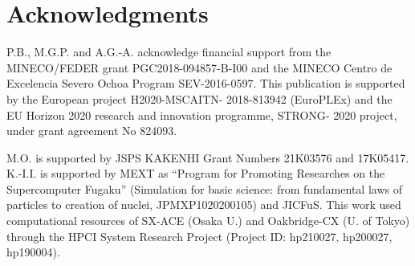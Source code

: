 \documentclass[a4paper,11pt]{article}
\begin{document}
\section*{Acknowledgments}
P.B., M.G.P. and A.G.-A. acknowledge financial support from the MINECO/FEDER grant PGC2018-094857-B-I00 and
the MINECO Centro de Excelencia Severo Ochoa Program SEV-2016-0597.
This publication is supported by the European project H2020-MSCAITN- 2018-813942 (EuroPLEx) and
the EU Horizon 2020 research and innovation programme, STRONG- 2020 project, under grant agreement No 824093.

M.O. is supported by JSPS KAKENHI Grant Numbers 21K03576 and 17K05417.
K.-I.I. is supported by MEXT as ``Program for Promoting Researches on the Supercomputer Fugaku''
(Simulation for basic science: from fundamental laws of particles to creation of nuclei, JPMXP1020200105) and JICFuS.
This work used computational resources of SX-ACE (Osaka U.) and Oakbridge-CX (U. of Tokyo)
through the HPCI System Research Project (Project ID: hp210027, hp200027, hp190004).
\end{document}
